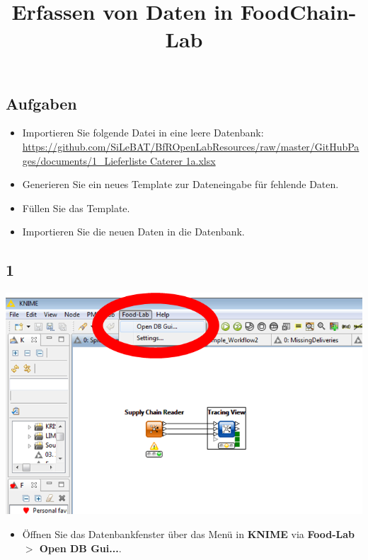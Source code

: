 \documentclass{beamer}
\title{Erfassen von Daten in FoodChain-Lab}
\date{}
\begin{document}
\maketitle

\section{ }

\subsection{Aufgaben}
\begin{frame}
	\begin{itemize}
		\item Importieren Sie folgende Datei in eine leere Datenbank: \url{https://github.com/SiLeBAT/BfROpenLabResources/raw/master/GitHubPages/documents/1_Lieferliste Caterer 1a.xlsx}
		\item Generieren Sie ein neues Template zur Dateneingabe für fehlende Daten.
        \item Füllen Sie das Template.
        \item Importieren Sie die neuen Daten in die Datenbank.
	\end{itemize}
\end{frame}
 
\subsection{1}
\begin{frame}
	\begin{center}
  		\includegraphics[height=0.6\textheight]{1.png}
	\end{center}
	\begin{itemize}
		\item Öffnen Sie das Datenbankfenster über das Menü in \textbf{KNIME} via \textbf{Food-Lab $>$ Open DB Gui...}.
	\end{itemize}
\end{frame}
\end{document}
